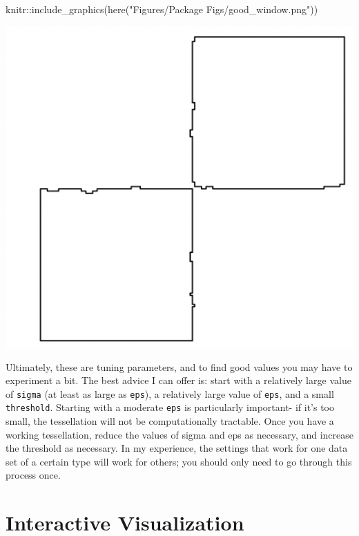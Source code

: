 \documentclass[
]{book}
\newenvironment{Shaded}{\begin{snugshade}}{\end{snugshade}}
\newcommand{\FunctionTok}[1]{\textcolor[rgb]{0.00,0.00,0.00}{#1}}
\newcommand{\NormalTok}[1]{#1}
\newcommand{\SpecialCharTok}[1]{\textcolor[rgb]{0.00,0.00,0.00}{#1}}
\newcommand{\StringTok}[1]{\textcolor[rgb]{0.31,0.60,0.02}{#1}}
\begin{document}
\begin{Shaded}
\begin{Highlighting}[]
\NormalTok{knitr}\SpecialCharTok{::}\FunctionTok{include\_graphics}\NormalTok{(}\FunctionTok{here}\NormalTok{(}\StringTok{"Figures/Package Figs/good\_window.png"}\NormalTok{))}
\end{Highlighting}
\end{Shaded}

\includegraphics[width=7.25in]{Figures/Package Figs/good_window}

Ultimately, these are tuning parameters, and to find good values you may have to experiment a bit. The best advice I can offer is: start with a relatively large value of \texttt{sigma} (at least as large as \texttt{eps}), a relatively large value of \texttt{eps}, and a small \texttt{threshold}. Starting with a moderate \texttt{eps} is particularly important- if it's too small, the tessellation will not be computationally tractable. Once you have a working tessellation, reduce the values of sigma and eps as necessary, and increase the threshold as necessary. In my experience, the settings that work for one data set of a certain type will work for others; you should only need to go through this process once.

\hypertarget{interactive-visualization}{%
\section{Interactive Visualization}\label{interactive-visualization}}
\end{document}

